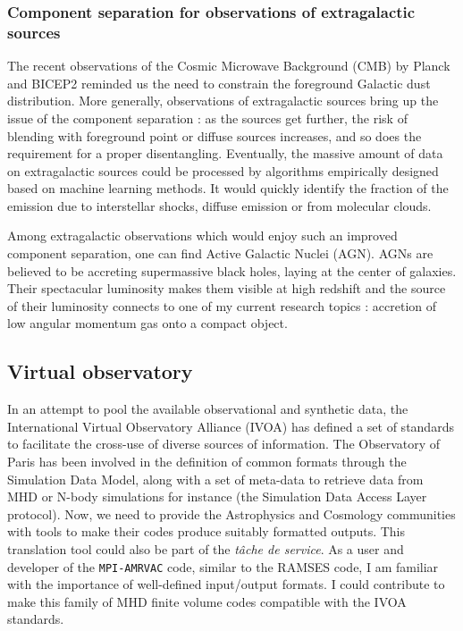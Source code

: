 \documentclass[a4paper,12pt,onecolumn]{article}
\begin{document}
\subsubsection*{Component separation for observations of extragalactic sources}

The recent observations of the Cosmic Microwave Background (CMB) by Planck and BICEP2 reminded us the need to constrain the foreground Galactic dust distribution. More generally, observations of extragalactic sources bring up the issue of the component separation : as the sources get further, the risk of blending with foreground point or diffuse sources increases, and so does the requirement for a proper disentangling. Eventually, the massive amount of data on extragalactic sources could be processed by algorithms empirically designed based on machine learning methods. It would quickly identify the fraction of the emission due to interstellar shocks, diffuse emission or from molecular clouds.

Among extragalactic observations which would enjoy such an improved component separation, one can find Active Galactic Nuclei (AGN). AGNs are believed to be accreting supermassive black holes, laying at the center of galaxies. Their spectacular luminosity makes them visible at high redshift and the source of their luminosity connects to one of my current research topics : accretion of low angular momentum gas onto a compact object.

\subsection*{Virtual observatory}

In an attempt to pool the available observational and synthetic data, the International Virtual Observatory Alliance (IVOA) has defined a set of standards to facilitate the cross-use of diverse sources of information. The Observatory of Paris has been involved in the definition of common formats through the Simulation Data Model, along with a set of meta-data to retrieve data from MHD or N-body simulations for instance (the Simulation Data Access Layer protocol). Now, we need to provide the Astrophysics and Cosmology communities with tools to make their codes produce suitably formatted outputs. This translation tool could also be part of the \textit{t\^{a}che de service}. As a user and developer of the \texttt{MPI-AMRVAC} code, similar to the RAMSES code, I am familiar with the importance of well-defined input/output formats. I could contribute to make this family of MHD finite volume codes compatible with the IVOA standards.
\end{document}
